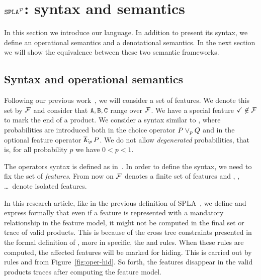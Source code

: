 \section{$\mathtt{SPLA{^{\cal P}}}$: syntax and semantics}
\label{sec:stat:sintaxMain}
In this section we introduce our language. In addition to present its syntax, we define an operational semantics and a denotational semantics. In the next section we will show the equivalence between these two semantic frameworks.


\subsection{Syntax and operational semantics}
\label{sec:stat:sintax}
Following our previous work~\cite{acl13,clc16}, we will consider a
set of features. We denote this set by ${\cal F}$ and consider that $\mathtt{A}, \mathtt{B},
\mathtt{C}$ range over ${\cal F}$. We have a special feature
$\checkmark\not\in{\cal F}$ to mark the end  of a product. We consider a syntax similar to
\fodaPA, where probabilities are introduced both in the choice operator $P \mathbin{\lor}_{p} Q $ and in
the optional feature operator $\overline{\mathtt{A}};_{p} P$. We do not allow
\emph{degenerated} probabilities, that is, for all probability $p$ we have $0< p<1$.

The operators syntax is defined as in~\cite{acl13,clc16}.
In order to define the syntax,
we need to fix the set of \emph{features}.
From now on ${\cal F}$ denotes a finite set  of features
and  , , \dots\ denote isolated features.


In this research article, like in the previous definition of SPLA~\cite{acl13,clc16},
we define and express formally that even if a feature is
represented with a mandatory relationship in the feature model,
it might not be computed in the final set or trace of valid products.
%
This is because of the cross tree constraints presented in the formal
definition of \fodaPA, more in specific, the  and  rules.
%
When these rules are computed, the affected features will be marked for hiding.
This is carried out by rules  and  from
Figure~\ref{fig:oper-hid}.
%
%
So forth, the features
disappear in the valid products traces after computing the feature model.



